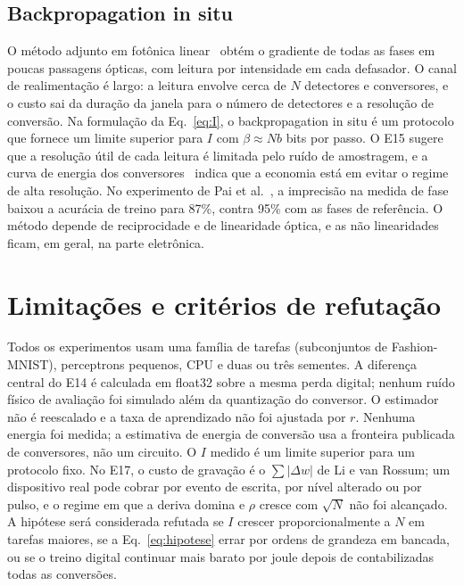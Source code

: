 \documentclass[journal]{IEEEtran}
\begin{document}
\subsection{Backpropagation in situ}
\label{sec:fotonica}

O método adjunto em fotônica linear~\cite{hughes2018,pai2023} obtém o gradiente de todas as fases em poucas passagens ópticas, com leitura por intensidade em cada defasador. O canal de realimentação é largo: a leitura envolve cerca de $N$ detectores e conversores, e o custo sai da duração da janela para o número de detectores e a resolução de conversão. Na formulação da Eq.~\eqref{eq:I}, o backpropagation in situ é um protocolo que fornece um limite superior para $I$ com $\beta \approx N b$ bits por passo. O E15 sugere que a resolução útil de cada leitura é limitada pelo ruído de amostragem, e a curva de energia dos conversores~\cite{jonsson2013} indica que a economia está em evitar o regime de alta resolução. No experimento de Pai et al.~\cite{pai2023}, a imprecisão na medida de fase baixou a acurácia de treino para 87\%, contra 95\% com as fases de referência. O método depende de reciprocidade e de linearidade óptica, e as não linearidades ficam, em geral, na parte eletrônica.

\section{Limitações e critérios de refutação}

Todos os experimentos usam uma família de tarefas (subconjuntos de Fashion-MNIST), perceptrons pequenos, CPU e duas ou três sementes. A diferença central do E14 é calculada em float32 sobre a mesma perda digital; nenhum ruído físico de avaliação foi simulado além da quantização do conversor. O estimador não é reescalado e a taxa de aprendizado não foi ajustada por $r$. Nenhuma energia foi medida; a estimativa de energia de conversão usa a fronteira publicada de conversores, não um circuito. O $I$ medido é um limite superior para um protocolo fixo. No E17, o custo de gravação é o $\sum|\Delta w|$ de Li e van Rossum; um dispositivo real pode cobrar por evento de escrita, por nível alterado ou por pulso, e o regime em que a deriva domina e $\rho$ cresce com $\sqrt N$ não foi alcançado. A hipótese será considerada refutada se $I$ crescer proporcionalmente a $N$ em tarefas maiores, se a Eq.~\eqref{eq:hipotese} errar por ordens de grandeza em bancada, ou se o treino digital continuar mais barato por joule depois de contabilizadas todas as conversões.
\end{document}
